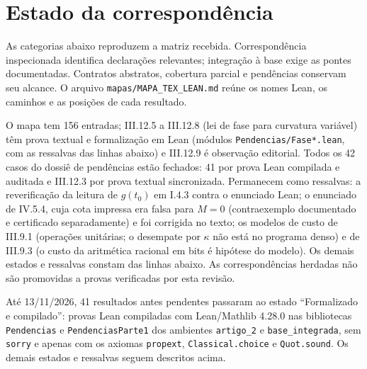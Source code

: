 \section*{Estado da correspondência}
As categorias abaixo reproduzem a matriz recebida. Correspondência inspecionada identifica declarações relevantes; integração à base exige as pontes documentadas. Contratos abstratos, cobertura parcial e pendências conservam seu alcance. O arquivo \texttt{mapas/MAPA\_TEX\_LEAN.md} reúne os nomes Lean, os caminhos e as posições de cada resultado.

O mapa tem 156 entradas; III.12.5 a III.12.8 (lei de fase para curvatura variável) têm prova textual e formalização em Lean (módulos \texttt{Pendencias/Fase*.lean}, com as ressalvas das linhas abaixo) e III.12.9 é observação editorial. Todos os 42 casos do dossiê de pendências estão fechados: 41 por prova Lean compilada e auditada e III.12.3 por prova textual sincronizada. Permanecem como ressalvas: a reverificação da leitura de $g(t_0)$ em I.4.3 contra o enunciado Lean; o enunciado de IV.5.4, cuja cota impressa era falsa para $M=0$ (contraexemplo documentado e certificado separadamente) e foi corrigida no texto; os modelos de custo de III.9.1 (operações unitárias; o desempate por $\kappa$ não está no programa denso) e de III.9.3 (o custo da aritmética racional em bits é hipótese do modelo). Os demais estados e ressalvas constam das linhas abaixo. As correspondências herdadas não são promovidas a provas verificadas por esta revisão.

Até 13/11/2026, 41 resultados antes pendentes passaram ao estado ``Formalizado e compilado'': provas Lean compiladas com Lean/Mathlib 4.28.0 nas bibliotecas \texttt{Pendencias} e \texttt{PendenciasParte1} dos ambientes \texttt{artigo\_2} e \texttt{base\_integrada}, sem \texttt{sorry} e apenas com os axiomas \texttt{propext}, \texttt{Classical.choice} e \texttt{Quot.sound}. Os demais estados e ressalvas seguem descritos acima.


